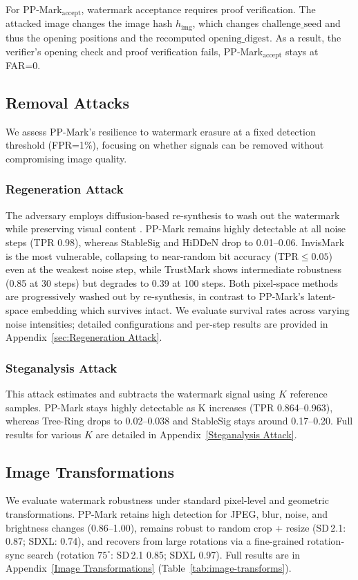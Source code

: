 \documentclass{article}
\theoremstyle{plain}
\theoremstyle{definition}
\theoremstyle{remark}
\begin{document}
For PP-Mark$_{\mathrm{accept}}$, watermark acceptance requires proof verification. The
attacked image changes the image hash $h_{\mathrm{img}}$, which changes 
$\mathrm{challenge\_seed}$ and thus the opening positions and the recomputed 
$\mathrm{opening\_digest}$. As a result, the verifier’s opening check and proof verification fails, PP‑Mark$_{\mathrm{accept}}$ stays at FAR=0.

\subsection{Removal Attacks}
We assess PP-Mark’s resilience to watermark erasure at a fixed detection threshold (FPR=1\%), focusing on whether signals can be removed without compromising image quality.

\subsubsection{Regeneration Attack}
The adversary employs diffusion-based re-synthesis to wash out the watermark while preserving visual content \cite{zhao2024removable}. PP-Mark remains highly detectable at all noise steps (TPR 0.98), whereas StableSig and HiDDeN drop to 0.01–0.06. InvisMark is the most vulnerable, collapsing to near-random bit accuracy (TPR${\le}0.05$) even at the weakest noise step, while TrustMark shows intermediate robustness (0.85 at 30 steps) but degrades to 0.39 at 100 steps. Both pixel-space methods are progressively washed out by re-synthesis, in contrast to PP-Mark's latent-space embedding which survives intact. We evaluate survival rates across varying noise intensities; detailed configurations and per-step results are provided in Appendix~\ref{sec:Regeneration Attack}.

\subsubsection{Steganalysis Attack}
This attack estimates and subtracts the watermark signal using $K$ reference samples. PP-Mark stays highly detectable as K increases (TPR 0.864–0.963), whereas Tree-Ring drops to 0.02–0.038 and StableSig stays around 0.17–0.20. Full results for various $K$ are detailed in Appendix~\ref{Steganalysis Attack}.

\subsection{Image Transformations}
We evaluate watermark robustness under standard pixel-level and geometric transformations.
PP-Mark retains high detection for JPEG, blur, noise, and brightness changes (0.86--1.00),
remains robust to random crop + resize (SD\,2.1: 0.87; SDXL: 0.74),
and recovers from large rotations via a fine-grained rotation-sync search
(rotation $75^\circ$: SD\,2.1 0.85; SDXL 0.97).
Full results are in Appendix~\ref{Image Transformations} (Table~\ref{tab:image-transforms}).
\end{document}

